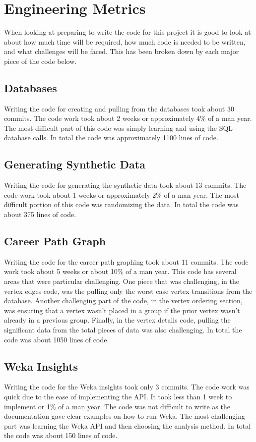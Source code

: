\section{Engineering Metrics}
\label{sect:engineering-metrics}
When looking at preparing to write the code for this project it is good to look
at about how much time will be required, how much code is needed to be written,
and what challenges will be faced.  This has been broken down by each major
piece of the code below.
\subsection{Databases}
Writing the code for creating and pulling from the databases took about 30
commits.  The code work took about 2 weeks or approximately 4\% of a man year. 
The most difficult part of this code was simply learning and using the SQL
database calls.  In total the code was approximately 1100 lines of code.
\subsection{Generating Synthetic Data}
Writing the code for generating the synthetic data took about 13 commits.  The
code work took about 1 weeks or approximately 2\% of a man year.  The most
difficult portion of this code was randomizing the data.  In total the code was
about 375 lines of code.
\subsection{Career Path Graph}
Writing the code for the career path graphing took about 11 commits.  The code
work took about 5 weeks or about 10\% of a man year.  This code has several
areas that were particular challenging.  One piece that was challenging, in the
vertex edges code, was the pulling only the worst case vertex transitions from
the database.  Another challenging part of the code, in the vertex ordering
section, was ensuring that a vertex wasn't placed in a group if the prior vertex
wasn't already in a previous group.  Finally, in the vertex details code, pulling
the significant data from the total pieces of data was also challenging.  In
total the code was about 1050 lines of code.
\subsection{Weka Insights}
Writing the code for the Weka insights took only 3 commits.  The code work was
quick due to the ease of implementing the API.  It took less than 1 week to
implement or 1\% of a man year.  The code was not difficult to write as the
documentation gave clear examples on how to run Weka.  The most challenging part
was learning the Weka API and then choosing the analysis method.  In total the
code was about 150 lines of code.
